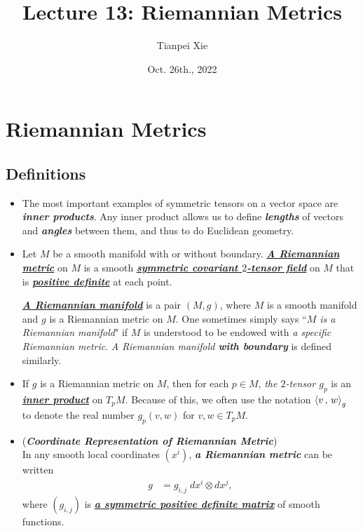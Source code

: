 \documentclass[11pt]{article}
\begin{document}
\title{Lecture 13: Riemannian Metrics}
\author{ Tianpei Xie}
\date{Oct. 26th., 2022}
\maketitle
\tableofcontents
\newpage
\section{Riemannian Metrics}
\subsection{Definitions}
\begin{itemize}
\item \begin{remark}
The most important examples of symmetric tensors on a vector space are \emph{\textbf{inner products}}. Any inner product allows us to define \emph{\textbf{lengths}} of vectors and \emph{\textbf{angles}} between them, and thus to do Euclidean geometry.
\end{remark}

\item \begin{definition}
Let $M$ be a smooth manifold with or without boundary. \underline{\emph{\textbf{A Riemannian metric}}} on $M$ is a smooth \underline{\emph{\textbf{symmetric covariant $2$-tensor field}}} on $M$ that is \underline{\emph{\textbf{positive definite}}} at each point. 

\underline{\emph{\textbf{A Riemannian manifold}}} is a pair $(M, g)$, where $M$ is a smooth manifold and $g$ is a Riemannian metric on $M$. One sometimes simply says ``\emph{$M$ is a Riemannian manifold}" if $M$ is understood to be endowed with \emph{a specific Riemannian metric}. \emph{A Riemannian manifold \textbf{with boundary}} is defined similarly.
\end{definition}

\item \begin{remark}
If $g$ is a Riemannian metric on $M$, then for each $p \in M$, \emph{the $2$-tensor $g_p$} is an \underline{\emph{\textbf{inner product}}} on $T_{p}M$. Because of this, we often use the notation $\left\langle v\,,\, w \right\rangle_g$ to denote the real number $g_p(v, w)$ for $v,w \in T_{p}M$.
\end{remark}

\item \begin{remark} (\emph{\textbf{Coordinate Representation of Riemannian Metric}})\\
In any smooth local coordinates  $(x^i)$, \emph{\textbf{a Riemannian metric}} can be written 
\begin{align}
g &= g_{i,j}\;dx^i \otimes dx^j, \label{eqn: riemannian_metric_tensor_product}
\end{align} where $(g_{i,j})$ is \underline{\emph{\textbf{a symmetric positive definite matrix}}} of smooth functions. 
\end{remark}


\end{itemize}
\end{document}
